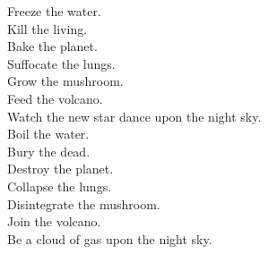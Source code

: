 Freeze the water. \\
Kill the living. \\
Bake the planet. \\
Suffocate the lungs. \\
Grow the mushroom. \\
Feed the volcano. \\
Watch the new star dance upon the night sky. \\

Boil the water. \\
Bury the dead. \\
Destroy the planet. \\
Collapse the lungs. \\
Disintegrate the mushroom. \\
Join the volcano. \\
Be a cloud of gas upon the night sky. \\
